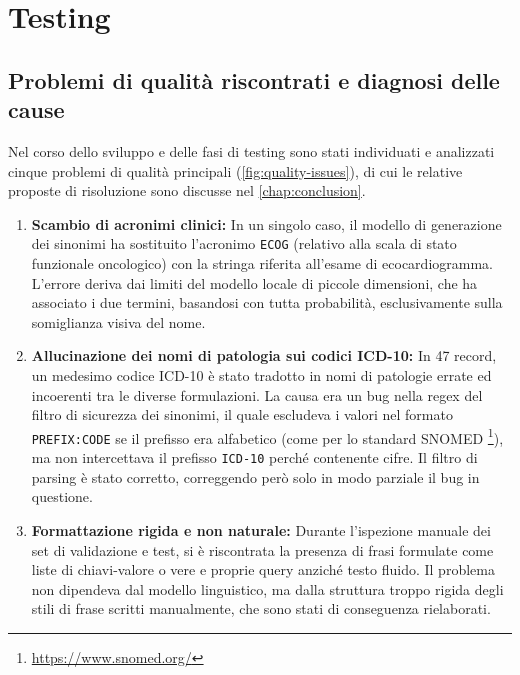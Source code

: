 \documentclass[12pt,a4paper,openright,twoside]{book}
\begin{document}
\section{Testing}
\label{sec:eval-testing}

\subsection{Problemi di qualità riscontrati e diagnosi delle cause}
\label{sec:eval-quality-issues}

Nel corso dello sviluppo e delle fasi di testing sono stati individuati e
analizzati cinque problemi di qualità principali (\cref{fig:quality-issues}), di
cui le relative proposte di risoluzione sono discusse nel
\cref{chap:conclusion}.

\begin{enumerate}
    \item \label{prob:ecog} \textbf{Scambio di acronimi clinici:} In un singolo
          caso, il modello di generazione dei sinonimi ha sostituito l'acronimo
          \texttt{ECOG} (relativo alla scala di stato funzionale oncologico) con
          la stringa riferita all'esame di ecocardiogramma. L'errore deriva dai
          limiti del modello locale di piccole dimensioni, che ha associato i
          due termini, basandosi con tutta probabilità, esclusivamente sulla
          somiglianza visiva del nome.

    \item \label{prob:icd10} \textbf{Allucinazione dei nomi di patologia sui
              codici ICD-10:} In 47 record, un medesimo codice ICD-10 è stato
          tradotto in nomi di patologie errate ed incoerenti tra le diverse
          formulazioni. La causa era un bug nella regex del filtro di
          sicurezza dei sinonimi, il quale escludeva i valori nel formato
          \texttt{PREFIX:CODE} se il prefisso era alfabetico (come per lo
          standard SNOMED \footnote{\url{https://www.snomed.org/}}), ma non
          intercettava il prefisso \texttt{ICD-10} perché contenente cifre.
          Il filtro di parsing è stato corretto, correggendo però solo in
          modo parziale il bug in questione.

    \item \label{prob:syntax} \textbf{Formattazione rigida e non naturale:}
          Durante l'ispezione manuale dei set di validazione e test, si è
          riscontrata la presenza di frasi formulate come liste di chiavi-valore
          o vere e proprie query anziché testo fluido. Il problema non dipendeva
          dal modello linguistico, ma dalla struttura troppo rigida degli stili
          di frase scritti manualmente, che sono stati di conseguenza
          rielaborati.


\end{enumerate}
\end{document}

